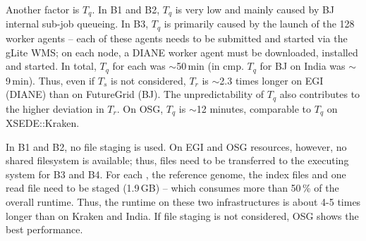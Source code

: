 \documentclass[conference]{IEEEtran}
\begin{document}
Another factor is $T_q$. In B1 and B2, $T_q$ is very low and mainly
caused by BJ internal sub-job queueing. In B3, $T_q$ is primarily
caused by the launch of the 128 worker agents -- each of these agents
needs to be submitted and started via the gLite WMS; on each node, a
DIANE worker agent must be downloaded, installed and started. In
total, $T_q$ for each \cu was $\sim$50\,min (in cmp. $T_q$ for BJ on
India was $\sim$9\,min). Thus, even if $T_s$ is not considered, $T_r$
is $\sim$2.3 times longer on EGI (DIANE) than on FutureGrid (BJ). The
unpredictability of $T_q$ also contributes to the higher deviation in
$T_r$. On OSG, $T_q$ is $\sim$12 minutes, comparable to $T_q$ on
XSEDE::Kraken.


In B1 and B2, no file staging is used. On EGI and OSG resources, however, no
shared filesystem is available; thus, files need to be transferred to the
executing system for B3 and B4. For each \cu, the reference genome, the
index files and one read file need to be staged (1.9\,GB) -- which consumes
more than 50\,\% of the overall runtime. Thus, the runtime on these two
infrastructures is about 4-5 times longer than on Kraken and India. If file
staging is not considered, OSG shows the best performance.  






\end{document}
